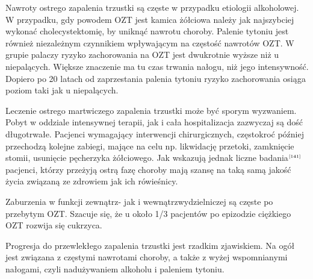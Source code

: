 \documentclass[a4paper, 12pt]{report}
\newcommand\cyt[1]{$^{\tiny{\cite{#1}}}$}
\begin{document}
Nawroty ostrego zapalenia trzustki są częste w przypadku etiologii
alkoholowej. W przypadku, gdy powodem OZT jest kamica żółciowa należy
jak najszybciej wykonać cholecystektomię, by uniknąć nawrotu
choroby. Palenie tytoniu jest również niezależnym czynnikiem wpływającym na
częstość nawrotów OZT. W grupie palaczy ryzyko zachorowania na OZT
jest dwukrotnie wyższe niż u niepalących. Większe znaczenie ma tu czas trwania
nałogu, niż jego intensywność. Dopiero po 20 latach od zaprzestania
palenia tytoniu ryzyko zachorowania osiąga poziom taki jak u
niepalących.

Leczenie ostrego martwiczego zapalenia trzustki może być sporym
wyzwaniem. Pobyt w oddziale intensywnej terapii, jak i cała
hospitalizacja zazwyczaj są dość długotrwałe. Pacjenci wymagający
interwencji chirurgicznych, częstokroć później przechodzą kolejne
zabiegi, mające na celu np. likwidację przetoki, zamknięcie stomii,
usunięcie pęcherzyka żółciowego. Jak wskazują jednak liczne
badania\cyt{141} pacjenci, którzy przeżyją ostrą fazę choroby mają
szansę na taką samą jakość życia związaną ze zdrowiem jak ich
rówieśnicy.

Zaburzenia w funkcji zewnątrz- jak i wewnątrzwydzielniczej są częste
po przebytym OZT. Szacuje się, że u około 1/3 pacjentów po epizodzie
ciężkiego OZT rozwija się cukrzyca.

Progresja do przewlekłego zapalenia trzustki jest rzadkim
zjawiskiem. Na ogół jest związana z częstymi nawrotami choroby, a
także z wyżej wspomnianymi nałogami, czyli nadużywaniem alkoholu i
paleniem tytoniu.
\end{document}
